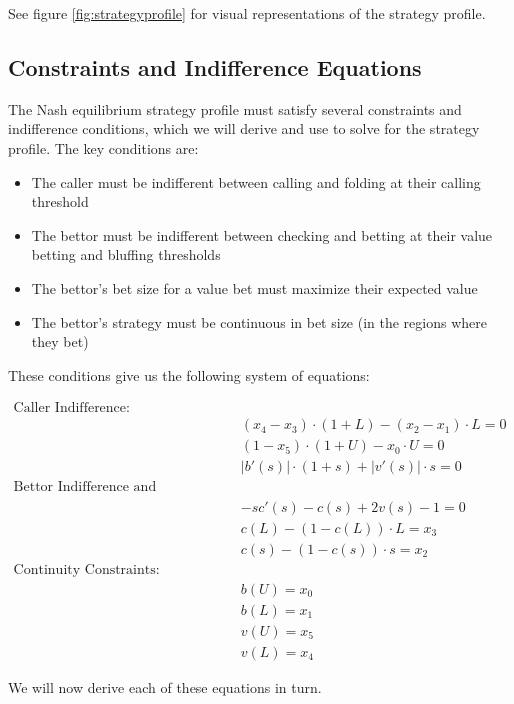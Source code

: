\documentclass[../../main/main.tex]{subfiles}
\begin{document}
See figure \ref{fig:strategyprofile} for visual representations of the strategy profile. 

\subsection{Constraints and Indifference Equations}

The Nash equilibrium strategy profile must satisfy several constraints and indifference conditions, which we will derive and use to solve for the strategy profile. The key conditions are:

\begin{itemize}
    \item The caller must be indifferent between calling and folding at their calling threshold
    \item The bettor must be indifferent between checking and betting at their value betting and bluffing thresholds
    \item The bettor's bet size for a value bet must maximize their expected value
    \item The bettor's strategy must be continuous in bet size (in the regions where they bet)
\end{itemize}

These conditions give us the following system of equations:

\begin{align*}
    \text{Caller Indifference:} & \\
    & (x_4-x_3) \cdot (1+L) - (x_2-x_1) \cdot L = 0\\
    & (1-x_5) \cdot (1+U) - x_0 \cdot U = 0\\
    & |b'(s)| \cdot (1 + s) + |v'(s)| \cdot s = 0\\
    \text{Bettor Indifference and Optimality:} & \\
    & -sc'(s) - c(s) + 2 v(s) - 1 = 0\\
    & c(L) - (1-c(L)) \cdot L = x_3\\
    & c(s) - (1-c(s)) \cdot s = x_2\\
    \text{Continuity Constraints:} & \\
    & b(U) = x_0 \\
    & b(L) = x_1 \\
    & v(U) = x_5 \\
    & v(L) = x_4
\end{align*}

We will now derive each of these equations in turn.
\end{document}
